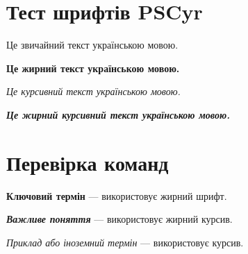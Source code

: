 ﻿\documentclass{./texmf/krvntu}
\newcommand{\term}[1]{\textbf{#1}}
\newcommand{\important}[1]{\textbf{\textit{#1}}}
\newcommand{\example}[1]{\textit{#1}}
\begin{document}
\section{Тест шрифтів PSCyr}

Це звичайний текст українською мовою.

\textbf{Це жирний текст українською мовою.}

\textit{Це курсивний текст українською мовою.}

\textbf{\textit{Це жирний курсивний текст українською мовою.}}

\section*{Перевірка команд}

\term{Ключовий термін} — використовує жирний шрифт.

\important{Важливе поняття} — використовує жирний курсив.

\example{Приклад або іноземний термін} — використовує курсив.
\end{document}

